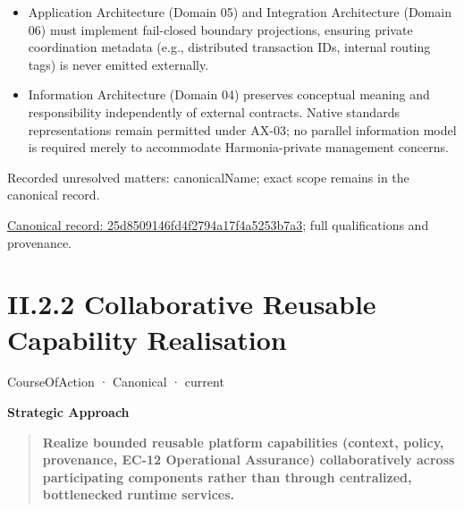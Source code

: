 \begin{itemize}


\item Application Architecture (Domain 05) and Integration Architecture (Domain 06) must implement fail-closed boundary projections, ensuring private coordination metadata (e.g., distributed transaction IDs, internal routing tags) is never emitted externally.

\item Information Architecture (Domain 04) preserves conceptual meaning and responsibility independently of external contracts. Native standards representations remain permitted under AX-03; no parallel information model is required merely to accommodate Harmonia-private management concerns.

\end{itemize}

{\small Recorded unresolved matters: canonicalName; exact scope remains in the canonical record.}\par
{\footnotesize \href{../../../../../../../continuum/strategy/course-of-action/25d8509146fd4f2794a17f4a5253b7a3.md}{Canonical record: 25d8509146fd4f2794a17f4a5253b7a3}; full qualifications and provenance.}\par
\section*{II.2.2 Collaborative Reusable Capability Realisation}
\label{navigation:II.2.2}

\label{element:503939e1fa464b78b1d980ddedfeb3cf}
{\small CourseOfAction · Canonical · current}\par

\par\medskip\textbf{Strategic Approach}\par


\begin{quote}


\textbf{Realize bounded reusable platform capabilities (context, policy, provenance, EC-12 Operational Assurance) collaboratively across participating components rather than through centralized, bottlenecked runtime services.}



\end{quote}


